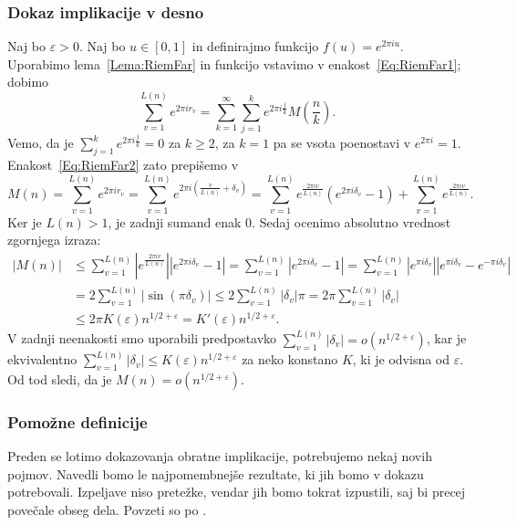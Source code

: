 \documentclass[mat1]{fmfdelo}
\begin{document}
\subsubsection{Dokaz implikacije v desno}
%
Naj bo $\varepsilon > 0$. Naj bo $u \in [0,1]$ in definirajmo funkcijo $f(u) = e^{2\pi iu}$. Uporabimo lema~\ref{Lema:RiemFar} in funkcijo vstavimo v enakost~\eqref{Eq:RiemFar1}; dobimo
\begin{equation}
\label{Eq:RiemFar2}
	\sum_{v=1}^{L(n)} e^{2\pi i r_{v}} = \sum_{k=1}^{\infty} \sum_{j=1}^{k} e^{2\pi i \frac{j}{k}} M \left(\frac{n}{k} \right).
\end{equation}
Vemo, da je $\sum_{j=1}^{k} e^{2\pi i \frac{j}{k}} = 0$ za $k \geq 2$, za $k=1$ pa se vsota poenostavi v $e^{2\pi i} = 1$.
Enakost~\eqref{Eq:RiemFar2} zato prepišemo v 
\[ M(n) = \sum_{v=1}^{L(n)} e^{2\pi i r_{v}} = \sum_{v=1}^{L(n)} e^{2\pi i \left(\frac{v}{L(n)} + \delta_{v} \right)} 
	   = \sum_{v=1}^{L(n)} e^{ \frac{2\pi i v}{L(n)} } \left(e^{2\pi i \delta_{v}} - 1 \right) + \sum_{v=1}^{L(n)} e^{ \frac{2\pi iv}{L(n)} }. \]
Ker je $L(n) > 1$, je zadnji sumand enak $0$. Sedaj ocenimo absolutno vrednost zgornjega izraza:
\begin{align*} 
|M(n)| &\leq \sum_{v=1}^{L(n)} \left|e^{ \frac{2\pi i v}{L(n)} } \right| \left|e^{2\pi i \delta_{v}} - 1 \right| 
	= \sum_{v=1}^{L(n)} \left|e^{2\pi i \delta_{v}} - 1 \right|
	= \sum_{v=1}^{L(n)} \left|e^{\pi i \delta_{v} } \right| \left|e^{\pi i \delta_{v}} - e^{-\pi i \delta_{v}}\right| \\
	&= 2 \sum_{v=1}^{L(n)} |\sin{(\pi \delta_{v})}| \leq 2 \sum_{v=1}^{L(n)} |\delta_{v}| \pi = 2 \pi \sum_{v=1}^{L(n)} |\delta_{v}| \\
	&\leq 2 \pi K(\varepsilon) n^{1/2 + \varepsilon} = K'(\varepsilon) n^{1/2 + \varepsilon}.
\end{align*}
V zadnji neenakosti smo uporabili predpostavko $ \sum_{v=1}^{L(n)}|\delta_{v}| = o(n^{1/2+\varepsilon}) $, kar je ekvivalentno 
$ \sum_{v=1}^{L(n)}|\delta_{v}| \leq K(\varepsilon) n^{1/2+\varepsilon}$ za neko konstano $K$, ki je odvisna od $\varepsilon$.
Od tod sledi, da je $M(n) = o(n^{1/2 + \varepsilon})$.

\subsubsection{Pomožne definicije}
Preden se lotimo dokazovanja obratne implikacije, potrebujemo nekaj novih pojmov. Navedli bomo le najpomembnejše rezultate, ki jih bomo v dokazu potrebovali. Izpeljave niso pretežke, vendar jih bomo tokrat izpustili, saj bi precej povečale obseg dela. Povzeti so po \cite[poglavje 6.2]{zetafunction}.
\end{document}
